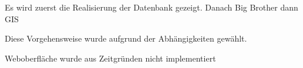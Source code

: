 Es wird zuerst die Realisierung der Datenbank gezeigt. Danach Big Brother dann GIS

Diese Vorgehensweise wurde aufgrund der Abhängigkeiten gewählt.


Weboberfläche wurde aus Zeitgründen nicht implementiert